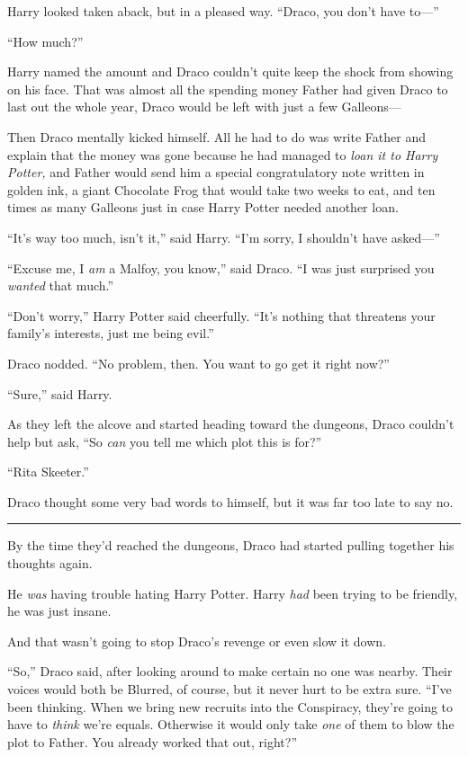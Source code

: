 Harry looked taken aback, but in a pleased way. ``Draco, you don't have
to---''

``How much?''

Harry named the amount and Draco couldn't quite keep the shock from
showing on his face. That was almost all the spending money Father had
given Draco to last out the whole year, Draco would be left with just a
few Galleons---

Then Draco mentally kicked himself. All he had to do was write Father
and explain that the money was gone because he had managed to \emph{loan
it to Harry Potter,} and Father would send him a special congratulatory
note written in golden ink, a giant Chocolate Frog that would take two
weeks to eat, and ten times as many Galleons just in case Harry Potter
needed another loan.

``It's way too much, isn't it,'' said Harry. ``I'm sorry, I shouldn't
have asked---''

``Excuse me, I \emph{am} a Malfoy, you know,'' said Draco. ``I was just
surprised you \emph{wanted} that much.''

``Don't worry,'' Harry Potter said cheerfully. ``It's nothing that
threatens your family's interests, just me being evil.''

Draco nodded. ``No problem, then. You want to go get it right now?''

``Sure,'' said Harry.

As they left the alcove and started heading toward the dungeons, Draco
couldn't help but ask, ``So \emph{can} you tell me which plot this is
for?''

``Rita Skeeter.''

Draco thought some very bad words to himself, but it was far too late to
say no.

\begin{center}\rule{3in}{0.4pt}\end{center}

By the time they'd reached the dungeons, Draco had started pulling
together his thoughts again.

He \emph{was} having trouble hating Harry Potter. Harry \emph{had} been
trying to be friendly, he was just insane.

And that wasn't going to stop Draco's revenge or even slow it down.

``So,'' Draco said, after looking around to make certain no one was
nearby. Their voices would both be Blurred, of course, but it never hurt
to be extra sure. ``I've been thinking. When we bring new recruits into
the Conspiracy, they're going to have to \emph{think} we're equals.
Otherwise it would only take \emph{one} of them to blow the plot to
Father. You already worked that out, right?''

